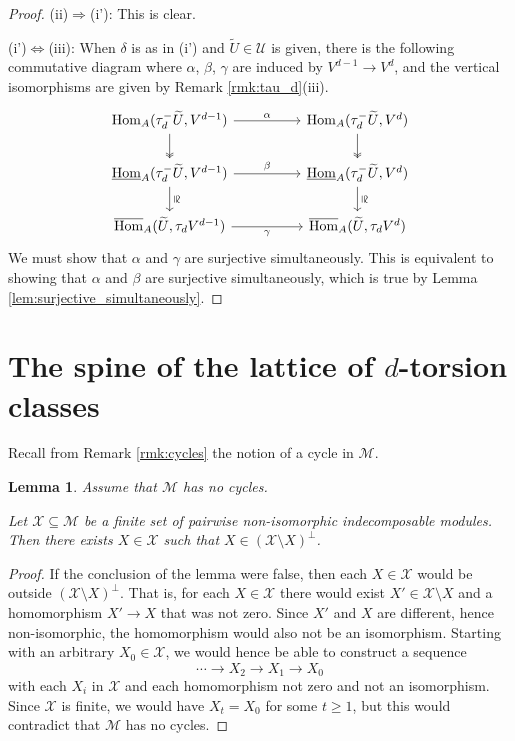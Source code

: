 \documentclass[12pt,reqno]{amsart}
\def\cM{\mathscr{M}}
\def\cU{\mathscr{U}}
\def\cX{\mathscr{X}}
\def\Hom{\operatorname{Hom}}
\numberwithin{equation}{section}
\newtheorem{Lemma}{Lemma}[section]
\theoremstyle{definition}
\theoremstyle{theorem}
\theoremstyle{definition}
\begin{document}
\begin{proof}
(ii)$\Rightarrow$(i'):  This is clear.

(i')$\Leftrightarrow$(iii):  When $\delta$ is as in (i') and $\widetilde{ U } \in \cU$ is given, there is the following commutative diagram where $\alpha$, $\beta$, $\gamma$ are induced by $V^{ d-1 } \xrightarrow{} V^d$, and the vertical isomorphisms are given by Remark \ref{rmk:tau_d}(iii).
\[
\begin{tikzcd}
	{\Hom_A( \tau_d^-\widetilde{ U },V^{ d-1 } )} && {\Hom_A( \tau_d^-\widetilde{ U },V^{ d } )} \\
	{\underline{ \Hom }_A( \tau_d^-\widetilde{ U },V^{ d-1 } )} && {\underline{ \Hom }_A( \tau_d^-\widetilde{ U },V^{ d } )} \\
	{\overline{ \Hom }_A( \widetilde{ U },\tau_dV^{ d-1 } )} && {\overline{ \Hom }_A( \widetilde{ U },\tau_dV^{ d } )}
	\arrow["\alpha", from=1-1, to=1-3]
	\arrow[two heads, from=1-1, to=2-1]
	\arrow[two heads, from=1-3, to=2-3]
	\arrow["\beta", from=2-1, to=2-3]
	\arrow["{\rotatebox{270}{$\cong$}}", from=2-1, to=3-1]
	\arrow["{\rotatebox{270}{$\cong$}}", from=2-3, to=3-3]
	\arrow["\gamma"', from=3-1, to=3-3]
\end{tikzcd}
\]
We must show that $\alpha$ and $\gamma$ are surjective simultaneously.  This is equivalent to showing that $\alpha$ and $\beta$ are surjective simultaneously, which is true by Lemma \ref{lem:surjective_simultaneously}.
\end{proof}




\section{The spine of the lattice of $d$-torsion classes}
\label{sec:spine}


Recall from Remark \ref{rmk:cycles} the notion of a cycle in $\cM$.

\begin{Lemma}
\label{lem:deleting_an_indecomposable_from_a_set}
Assume that $\cM$ has no cycles.  

Let $\cX \subseteq \cM$ be a finite set of pairwise non-isomorphic indecomposable modules.  Then there exists $X \in \cX$ such that $X \in ( \cX \setminus X )^{ \perp }$.
\end{Lemma}

\begin{proof}
If the conclusion of the lemma were false, then each $X \in \cX$ would be outside $( \cX \setminus X )^{ \perp }$.  That is, for each $X \in \cX$ there would exist $X' \in \cX \setminus X$ and a homomorphism $X' \xrightarrow{} X$ that was not zero.  Since $X'$ and $X$ are different, hence non-isomorphic, the homomorphism would also not be an isomorphism.  Starting with an arbitrary $X_0 \in \cX\!$, we would hence be able to construct a sequence
\[
  \cdots \xrightarrow{} X_2 \xrightarrow{} X_1 \xrightarrow{} X_0
\]
with each $X_i$ in $\cX$ and each homomorphism not zero and not an isomorphism.  Since $\cX$ is finite, we would have $X_t = X_0$ for some $t \geqslant 1$, but this would contradict that $\cM$ has no cycles.
\end{proof}
\end{document}
